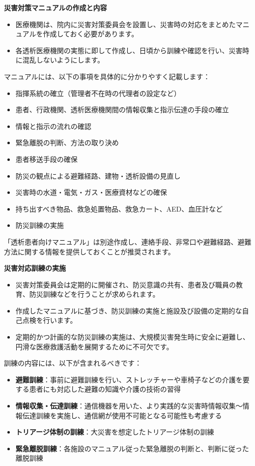 \documentclass[
  japanese,
  letterpaper,
  DIV=11,
  numbers=noendperiod]{scrartcl}
\providecommand{\tightlist}{%
  \setlength{\itemsep}{0pt}\setlength{\parskip}{0pt}}
\begin{document}
\textbf{災害対策マニュアルの作成と内容}

\begin{itemize}
\tightlist
\item
  医療機関は、院内に災害対策委員会を設置し、災害時の対応をまとめたマニュアルを作成しておく必要があります。
\item
  各透析医療機関の実態に即して作成し、日頃から訓練や確認を行い、災害時に混乱しないようにします。
\end{itemize}

マニュアルには、以下の事項を具体的に分かりやすく記載します：

\begin{itemize}
\tightlist
\item
  指揮系統の確立（管理者不在時の代理者の設定など）
\item
  患者、行政機関、透析医療機関間の情報収集と指示伝達の手段の確立
\item
  情報と指示の流れの確認
\item
  緊急離脱の判断、方法の取り決め
\item
  患者移送手段の確保
\item
  防災の観点による避難経路、建物・透析設備の見直し
\item
  災害時の水道・電気・ガス・医療資材などの確保
\item
  持ち出すべき物品、救急処置物品、救急カート、AED、血圧計など
\item
  防災訓練の実施
\end{itemize}

「透析患者向けマニュアル」は別途作成し、連絡手段、非常口や避難経路、避難方法に関する情報を提供しておくことが推奨されます。

\textbf{災害対応訓練の実施}

\begin{itemize}
\tightlist
\item
  災害対策委員会は定期的に開催され、防災意識の共有、患者及び職員の教育、防災訓練などを行うことが求められます。
\item
  作成したマニュアルに基づき、防災訓練の実施と施設及び設備の定期的な自己点検を行います。
\item
  定期的かつ計画的な防災訓練の実施は、大規模災害発生時に安全に避難し、円滑な医療救護活動を展開するために不可欠です。
\end{itemize}

訓練の内容には、以下が含まれるべきです：

\begin{itemize}
\tightlist
\item
  \textbf{避難訓練}：事前に避難訓練を行い、ストレッチャーや車椅子などの介護を要する患者にも対応した避難の知識や介護の技術の習得
\item
  \textbf{情報収集・伝達訓練}：通信機器を用いた、より実践的な災害時情報収集〜情報伝達訓練を実施し、通信網が使用不可能となる可能性も考慮する
\item
  \textbf{トリアージ体制の訓練}：大災害を想定したトリアージ体制の訓練
\item
  \textbf{緊急離脱訓練}：各施設のマニュアル従った緊急離脱の判断と、判断に従った離脱訓練
\end{itemize}
\end{document}
